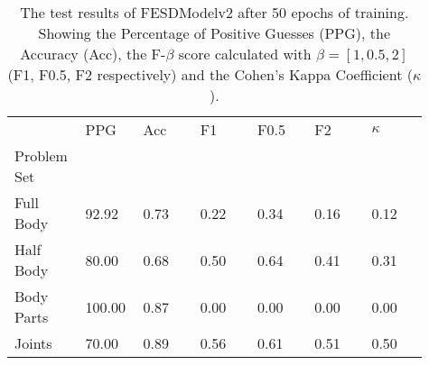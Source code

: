     \begin{table}[!htbp]
        \caption[Test Results of FESDModelv2]{The test results of FESDModelv2 after 50 epochs of training. Showing the Percentage of Positive Guesses (PPG), the Accuracy (Acc), the F-$\beta$ score calculated with $\beta = [1, 0.5, 2]$ (F1, F0.5, F2 respectively) and the Cohen's Kappa Coefficient ($\kappa$).}
        \label{tab:res_v2}
        \begin{tabular}{p{0.13\linewidth}p{0.13\linewidth}p{0.13\linewidth}p{0.13\linewidth}p{0.13\linewidth}p{0.13\linewidth}p{0.13\linewidth}}
\hline
{} &    PPG &  Acc &   F1 &  F0.5 &   F2 &  $\kappa$ \\
Problem Set   &        &      &      &       &      &           \\
\hline
Full Body  &  92.92 & 0.73 & 0.22 &  0.34 & 0.16 &      0.12 \\
Half Body  &  80.00 & 0.68 & 0.50 &  0.64 & 0.41 &      0.31 \\
Body Parts & 100.00 & 0.87 & 0.00 &  0.00 & 0.00 &      0.00 \\
Joints     &  70.00 & 0.89 & 0.56 &  0.61 & 0.51 &      0.50 \\
\hline
\end{tabular}

    \end{table}
  
